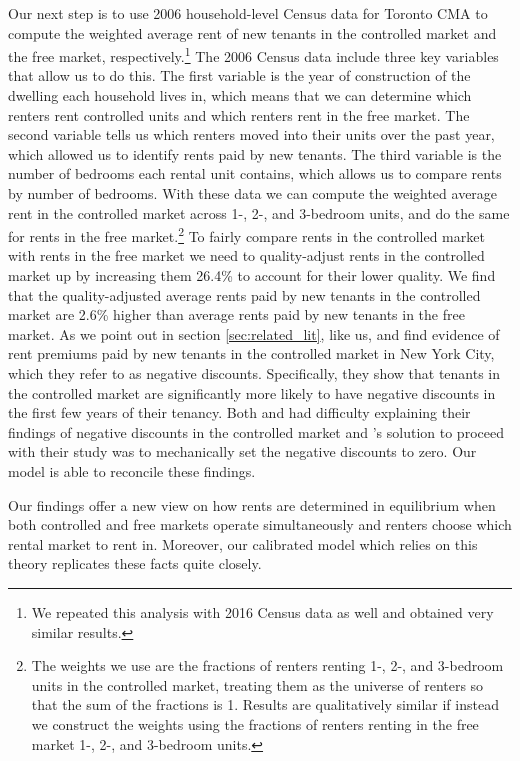 \documentclass[parskip=full]{article}
\begin{document}
Our next step is to use 2006 household-level Census data for Toronto CMA to compute the weighted average rent of new tenants in the controlled market and the free market, respectively.\footnote{We repeated this analysis with 2016 Census data as well and obtained very similar results.} The 2006 Census data include three key variables that allow us to do this. The first variable is the year of construction of the dwelling each household lives in, which means that we can determine which renters rent controlled units and which renters rent in the free market. The second variable tells us which renters moved into their units over the past year, which allowed us to identify rents paid by new tenants. The third variable is the number of bedrooms each rental unit contains, which allows us to compare rents by number of bedrooms. With these data we can compute the weighted average rent in the controlled market across 1-, 2-, and 3-bedroom units, and do the same for rents in the free market.\footnote{The weights we use are the fractions of renters renting 1-, 2-, and 3-bedroom units in the controlled market, treating them as the universe of renters so that the sum of the fractions is 1. Results are qualitatively similar if instead we construct the weights using the fractions of renters renting in the free market 1-, 2-, and 3-bedroom units.} To fairly compare rents in the controlled market with rents in the free market we need to quality-adjust rents in the controlled market up by increasing them 26.4\% to account for their lower quality. We find that the quality-adjusted average rents paid by new tenants in the controlled market are 2.6\% higher than average rents paid by new tenants in the free market. As we point out in section \ref{sec:related_lit}, like us, \citet{early-2000} and \citet{cjq-2023} find evidence of rent premiums paid by new tenants in the controlled market in New York City, which they refer to as negative discounts. Specifically, they show that tenants in the controlled market are significantly more likely to have negative discounts in the first few years of their tenancy. Both \citet{early-2000} and \citet{cjq-2023} had difficulty explaining their findings of negative discounts in the controlled market and \citet{early-2000}'s solution to proceed with their study was to mechanically set the negative discounts to zero. Our model is able to reconcile these findings.

Our findings offer a new view on how rents are determined in equilibrium when both controlled and free markets operate simultaneously and renters choose which rental market to rent in. Moreover, our calibrated model which relies on this theory replicates these facts quite closely. 
\end{document}
